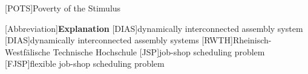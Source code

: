 [POTS]{Poverty of the Stimulus}


\begin{acronym}[Abbreviation]
 [Abbreviation]{\textbf{Explanation}} 
 [DIAS]{dynamically interconnected assembly system}
 [DIAS]{dynamically interconnected assembly systems}
 [RWTH]{Rheinisch-Westfälische Technische Hochschule}
 [JSP]{job-shop scheduling problem}
 [FJSP]{flexible job-shop scheduling problem}
\end{acronym}
